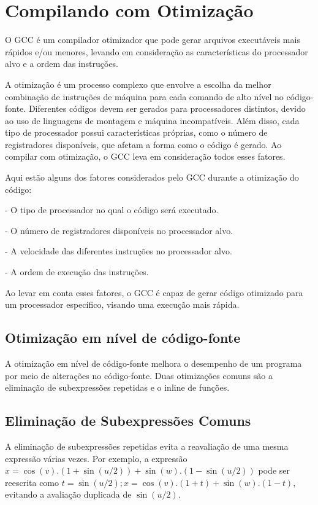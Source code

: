 \chapter{Compilando com Otimização}

O GCC é um compilador otimizador que pode gerar arquivos executáveis mais rápidos e/ou menores, levando em consideração as características do processador alvo e a ordem das instruções.

A otimização é um processo complexo que envolve a escolha da melhor combinação de instruções de máquina para cada comando de alto nível no código-fonte. Diferentes códigos devem ser gerados para processadores distintos, devido ao uso de linguagens de montagem e máquina incompatíveis. Além disso, cada tipo de processador possui características próprias, como o número de registradores disponíveis, que afetam a forma como o código é gerado. Ao compilar com otimização, o GCC leva em consideração todos esses fatores.

Aqui estão alguns dos fatores considerados pelo GCC durante a otimização do código:

- O tipo de processador no qual o código será executado.

- O número de registradores disponíveis no processador alvo.

- A velocidade das diferentes instruções no processador alvo.

- A ordem de execução das instruções.

Ao levar em conta esses fatores, o GCC é capaz de gerar código otimizado para um processador específico, visando uma execução mais rápida.

\section{Otimização em nível de código-fonte}

A otimização em nível de código-fonte melhora o desempenho de um programa por meio de alterações no código-fonte. Duas otimizações comuns são a eliminação de subexpressões repetidas e o inline de funções.

\section{Eliminação de Subexpressões Comuns}

A eliminação de subexpressões repetidas evita a reavaliação de uma mesma expressão várias vezes. Por exemplo, a expressão $x = \cos(v).(1+\sin(u/2)) + \sin(w).(1-\sin(u/2))$ pode ser reescrita como $t = \sin(u/2); x = \cos(v).(1+t) + \sin(w).(1-t)$, evitando a avaliação duplicada de $\sin(u/2)$.

